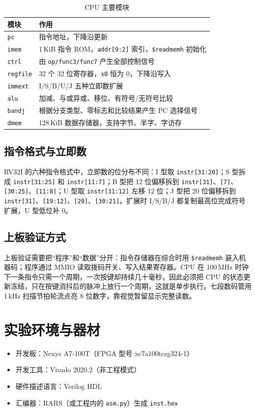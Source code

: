 \documentclass[12pt, a4paper]{ctexart}
\begin{document}
\begin{table}[htbp]
    \centering
    \caption{CPU 主要模块}
    \begin{tabular}{ll}
        \hline
        模块 & 作用 \\
        \hline
        \texttt{pc}      & 指令地址，下降沿更新 \\
        \texttt{imem}    & 1\,KiB 指令 ROM，\texttt{addr[9:2]} 索引，\texttt{\$readmemh} 初始化 \\
        \texttt{ctrl}    & 由 \texttt{op/func3/func7} 产生全部控制信号 \\
        \texttt{regfile} & 32 个 32 位寄存器，\texttt{x0} 恒为 0，下降沿写入 \\
        \texttt{immext}  & I/S/B/U/J 五种立即数扩展 \\
        \texttt{alu}     & 加减、与或异或、移位、有符号/无符号比较 \\
        \texttt{bandj}   & 根据分支类型、零标志和比较结果产生 PC 选择信号 \\
        \texttt{dmem}    & 128\,KiB 数据存储器，支持字节、半字、字访存 \\
        \hline
    \end{tabular}
\end{table}

\subsection{指令格式与立即数}
RV32I 的六种指令格式中，立即数的位分布不同：I 型取 \texttt{instr[31:20]}；S 型拆成 \texttt{instr[31:25]} 和 \texttt{instr[11:7]}；B 型把 12 位偏移拆到 \texttt{instr[31]}、\texttt{[7]}、\texttt{[30:25]}、\texttt{[11:8]}；U 型取 \texttt{instr[31:12]} 左移 12 位；J 型把 20 位偏移拆到 \texttt{instr[31]}、\texttt{[19:12]}、\texttt{[20]}、\texttt{[30:21]}。扩展时 I/S/B/J 都复制最高位完成符号扩展，U 型低位补 0。

\subsection{上板验证方式}
上板验证需要把“程序”和“数据”分开：指令存储器在综合时用 \texttt{\$readmemh} 装入机器码；程序通过 MMIO 读取拨码开关、写入结果寄存器。CPU 在 100\,MHz 时钟下一条指令只需一个周期，一次按键却持续几十毫秒，因此必须把 CPU 的状态更新冻结，只在按键消抖后的脉冲上放行一个周期，这就是单步执行。七段数码管用 1\,kHz 扫描节拍轮流点亮 8 位数字，靠视觉暂留显示完整读数。

\section{实验环境与器材}
\begin{itemize}
    \item 开发板：Nexys A7-100T（FPGA 型号 xc7a100tcsg324-1）
    \item 开发工具：Vivado 2020.2（非工程模式）
    \item 硬件描述语言：Verilog HDL
    \item 汇编器：RARS（或工程内的 \texttt{asm.py}）生成 \texttt{inst.hex}
\end{itemize}
\end{document}

